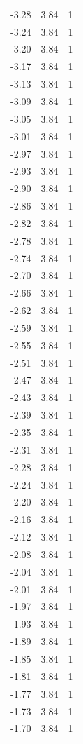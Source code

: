\begin{longtable}{lrr}
  -3.28 & 3.84 & 1 \\
  -3.24 & 3.84 & 1 \\
  -3.20 & 3.84 & 1 \\
  -3.17 & 3.84 & 1 \\
  -3.13 & 3.84 & 1 \\
  -3.09 & 3.84 & 1 \\
  -3.05 & 3.84 & 1 \\
  -3.01 & 3.84 & 1 \\
  -2.97 & 3.84 & 1 \\
  -2.93 & 3.84 & 1 \\
  -2.90 & 3.84 & 1 \\
  -2.86 & 3.84 & 1 \\
  -2.82 & 3.84 & 1 \\
  -2.78 & 3.84 & 1 \\
  -2.74 & 3.84 & 1 \\
  -2.70 & 3.84 & 1 \\
  -2.66 & 3.84 & 1 \\
  -2.62 & 3.84 & 1 \\
  -2.59 & 3.84 & 1 \\
  -2.55 & 3.84 & 1 \\
  -2.51 & 3.84 & 1 \\
  -2.47 & 3.84 & 1 \\
  -2.43 & 3.84 & 1 \\
  -2.39 & 3.84 & 1 \\
  -2.35 & 3.84 & 1 \\
  -2.31 & 3.84 & 1 \\
  -2.28 & 3.84 & 1 \\
  -2.24 & 3.84 & 1 \\
  -2.20 & 3.84 & 1 \\
  -2.16 & 3.84 & 1 \\
  -2.12 & 3.84 & 1 \\
  -2.08 & 3.84 & 1 \\
  -2.04 & 3.84 & 1 \\
  -2.01 & 3.84 & 1 \\
  -1.97 & 3.84 & 1 \\
  -1.93 & 3.84 & 1 \\
  -1.89 & 3.84 & 1 \\
  -1.85 & 3.84 & 1 \\
  -1.81 & 3.84 & 1 \\
  -1.77 & 3.84 & 1 \\
  -1.73 & 3.84 & 1 \\
  -1.70 & 3.84 & 1 \\

\end{longtable}
